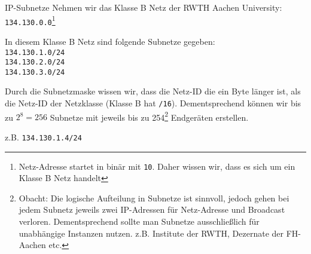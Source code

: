 \begin{example}{IP-Subnetze}
    Nehmen wir das Klasse B Netz der RWTH Aachen University:
    \texttt{134.130.0.0}\footnote{
        Netz-Adresse startet in binär mit \texttt{10}.
        Daher wissen wir, dass es sich um ein Klasse B Netz handelt
    }

    In diesem Klasse B Netz sind folgende Subnetze gegeben:\\
    \texttt{134.130.1.0/24}\\
    \texttt{134.130.2.0/24}\\
    \texttt{134.130.3.0/24}

    Durch die Subnetzmaske wissen wir, dass die Netz-ID die ein Byte länger ist, als die Netz-ID der Netzklasse (Klasse B hat \texttt{/16}).
    Dementsprechend können wir bis zu $2^8 = 256$ Subnetze mit jeweils bis zu 254\footnote{
        Obacht: Die logische Aufteilung in Subnetze ist sinnvoll, jedoch gehen bei jedem Subnetz jeweils zwei IP-Adressen für Netz-Adresse und Broadcast verloren.
        Dementsprechend sollte man Subnetze ausschließlich für unabhängige Instanzen nutzen.
        z.B. Institute der RWTH, Dezernate der FH-Aachen etc.
    } Endgeräten erstellen.

    z.B. \texttt{134.130.1.4/24}


\end{example}
